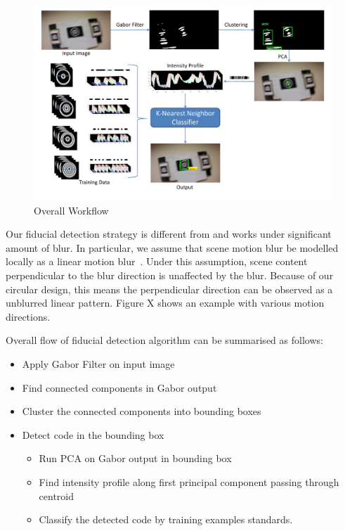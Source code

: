 \documentclass[runningheads]{llncs}
\begin{document}
\begin{figure}
\includegraphics[width=\linewidth]{overall_flow.pdf}
\caption{Overall Workflow}
\end{figure}
Our fiducial detection strategy is different from \cite{NaimarkF02,Pitag13} and works
under significant amount of blur.   In particular, we assume that scene motion 
blur be modelled locally as a linear motion blur~\cite{}.  Under this assumption,
scene content perpendicular to the blur direction is unaffected by the blur.  Because
of our circular design, this means the perpendicular direction can be observed as a 
unblurred linear pattern.  Figure X shows an example with various motion directions.

Overall flow of fiducial detection algorithm can be summarised as follows:

\begin{itemize}
  \item Apply Gabor Filter on input image
  \item Find connected components in Gabor output
  \item Cluster the connected components into bounding boxes
  \item Detect code in the bounding box
  \begin{itemize}
    \item Run PCA on Gabor output in bounding box
    \item Find intensity profile along first principal component passing through
    centroid
    \item Classify the detected code by training examples
    standards.
  \end{itemize}
\end{itemize}
\end{document}
